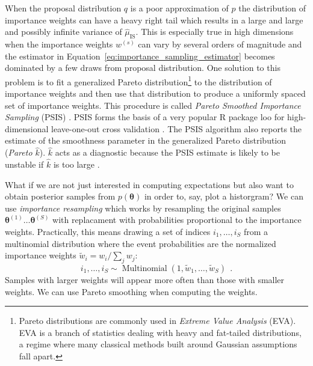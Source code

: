 \documentclass[12pt,dvipsnames]{report}
\newcommand{\ssf}[1]{\textsf{#1}}
\renewcommand{\vec}[1]{\boldsymbol{\mathbf{#1}}}
\newcommand{\hquad}{~~}
\begin{document}
When the proposal distribution $q$ is a poor approximation of $p$ the distribution of 
importance weights can have a heavy right tail which results in a large and 
large and possibly infinite variance of $\hat{\mu}_{\mathrm{IS}}$.
This is especially true in high dimensions when the importance weights $w^{(s)}$ can 
vary by several orders of magnitude and the estimator in 
Equation~\ref{eq:importance_sampling_estimator} becomes dominated by a few draws from 
proposal distribution. One solution to this  problem is to fit a generalized 
Pareto distribution\footnote{Pareto distributions are commonly used in \textsl{Extreme 
Value Analysis} (EVA). EVA is a branch of statistics dealing with heavy and fat-tailed 
distributions, a regime where many classical methods built around Gaussian assumptions 
fall apart.} 
to the distribution of importance weights and then use that distribution to produce 
a uniformly spaced set of importance weights. This procedure is called 
\textsl{Pareto Smoothed Importance Sampling} (PSIS) \citep{arXiv:1507.02646}.
PSIS forms the basis of a very popular \ssf{R} package \ssf{loo} for 
high-dimensional leave-one-out cross validation \citep{arXiv:1507.04544}.
The PSIS algorithm also reports the estimate of the smoothness parameter in the
generalized Pareto distribution (\textsl{Pareto $\hat{k}$}). $\hat{k}$ acts as a 
diagnostic  because the PSIS estimate is likely to be unstable  if $\hat{k}$ is 
too large \citep{arXiv:1507.02646}.

What if we are not just interested in computing expectations but also want to obtain 
posterior samples from $p(\vec{\theta})$ in order to, say, plot a historgram? We can 
use \textsl{importance resampling} which works by resampling the original samples 
$\vec{\theta}^{(1)} \dots \vec{\theta}^{(S)}$
with replacament with probabilities proportional to  the importance weights.
Practically, this means drawing a set of indices $i_1, \dots, i_S$ from a 
multinomial distribution  where the event probabilities are the normalized importance 
weights $\tilde{w}_{i}=w_{i} / \sum_{j} w_{j}$:
\begin{equation}
i_{1}, \ldots, i_{S} \sim \operatorname{Multinomial}\left(1, \tilde{w}_{1}, \ldots, \tilde{w}_{S}\right)\hquad .
\end{equation}
Samples with larger weights will appear more often than those with smaller weights. 
We can use Pareto smoothing when computing the weights. 
\end{document}
